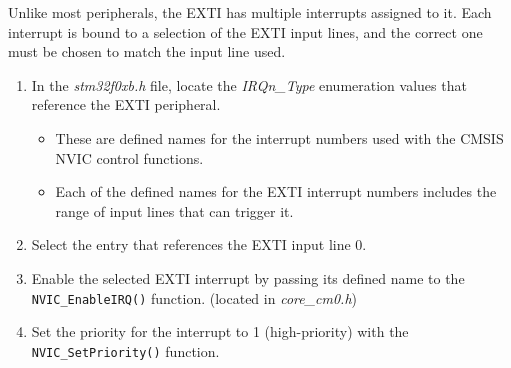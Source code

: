 \documentclass[11pt,fleqn]{book} %
\makeatletter
\newcommand{\ilcode}[1]{
    \smallskip
    \colorbox{gray!20!white}{
        \centering
        \parbox{\linewidth-2\fboxsep}{
            \lstinline@#1@
        }
    }
}
\makeatother
\begin{document}
\begin{exercise}
    \label{ex4}
    Unlike most peripherals, the EXTI has multiple interrupts assigned to it. Each interrupt is bound to a selection of the EXTI input lines, and the correct one must be chosen to match the input line used. 
    \begin{enumerate}
        \item In the \textit{stm32f0xb.h} file, locate the \textit{IRQn\_Type} enumeration values that reference the EXTI peripheral. 
        \begin{itemize}
            \item These are defined names for the interrupt numbers used with the CMSIS NVIC control functions.
            \item Each of the defined names for the EXTI interrupt numbers includes the range of input lines that can trigger it. 
        \end{itemize}
        \item Select the entry that references the EXTI input line 0.
        \item Enable the selected EXTI interrupt by passing its defined name to the  \texttt{NVIC\_EnableIRQ()} function. (located in \textit{core\_cm0.h})
        \item Set the priority for the interrupt to 1 (high-priority) with the \texttt{NVIC\_SetPriority()} function.
    \end{enumerate}
    
\end{exercise}



%    
%    
%    
%    
%    
\end{document}
